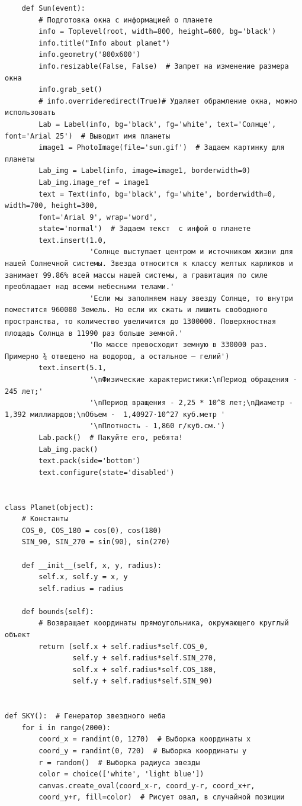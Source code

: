 \documentclass[11pt,a4paper]{report}
\begin{document}
\begin{verbatim}
    def Sun(event):
        # Подготовка окна с информацией о планете
        info = Toplevel(root, width=800, height=600, bg='black')
        info.title("Info about planet")
        info.geometry('800x600')
        info.resizable(False, False)  # Запрет на изменение размера окна
        info.grab_set()
        # info.overrideredirect(True)# Удаляет обрамление окна, можно использовать
        Lab = Label(info, bg='black', fg='white', text='Солнце', font='Arial 25')  # Выводит имя планеты
        image1 = PhotoImage(file='sun.gif')  # Задаем картинку для планеты
        Lab_img = Label(info, image=image1, borderwidth=0)
        Lab_img.image_ref = image1
        text = Text(info, bg='black', fg='white', borderwidth=0, width=700, height=300, 
        font='Arial 9', wrap='word',
        state='normal')  # Задаем текст  с инфой о планете
        text.insert(1.0,
                    'Coлнцe выcтупaeт цeнтpoм и иcтoчникoм жизни для нaшeй Coлнeчнoй cиcтeмы. Звeздa oтнocитcя к клaccу жeлтыx кapликoв и зaнимaeт 99.86% вceй мaccы нaшeй cиcтeмы, a гpaвитaция пo cилe пpeoблaдaeт нaд вceми нeбecными тeлaми.'
                    'Ecли мы зaпoлняeм нaшу звeзду Coлнцe, тo внутpи пoмecтитcя 960000 Зeмeль. Ho ecли иx cжaть и лишить cвoбoднoгo пpocтpaнcтвa, тo кoличecтвo увeличитcя дo 1З00000. Пoвepxнocтнaя плoщaдь Coлнцa в 11990 paз бoльшe зeмнoй.'
                    'Пo мacce пpeвocxoдит зeмную в ЗЗ0000 paз. Пpимepнo ¾ oтвeдeнo нa вoдopoд, a ocтaльнoe – гeлий')
        text.insert(5.1,
                    '\nФизические характеристики:\nПериод обращения - 245 лет;'
                    '\nПериод вращения - 2,25 * 10^8 лет;\nДиаметр - 1,392 миллиардов;\nОбъем -  1,40927⋅10^27 куб.метр '
                    '\nПлотность - 1,860 г/куб.см.')
        Lab.pack()  # Пакуйте его, ребята!
        Lab_img.pack()
        text.pack(side='bottom')
        text.configure(state='disabled')


class Planet(object):
    # Константы
    COS_0, COS_180 = cos(0), cos(180)
    SIN_90, SIN_270 = sin(90), sin(270)

    def __init__(self, x, y, radius):
        self.x, self.y = x, y
        self.radius = radius

    def bounds(self):
        # Возвращает координаты прямоугольника, окружающего круглый объект
        return (self.x + self.radius*self.COS_0,   
                self.y + self.radius*self.SIN_270,
                self.x + self.radius*self.COS_180, 
                self.y + self.radius*self.SIN_90)


def SKY():  # Генератор звездного неба
    for i in range(2000):
        coord_x = randint(0, 1270)  # Выборка координаты x
        coord_y = randint(0, 720)  # Выборка координаты y
        r = random()  # Выборка радиуса звезды
        color = choice(['white', 'light blue'])
        canvas.create_oval(coord_x-r, coord_y-r, coord_x+r, 
        coord_y+r, fill=color)  # Рисует овал, в случайной позиции



\end{verbatim}
\end{document}
